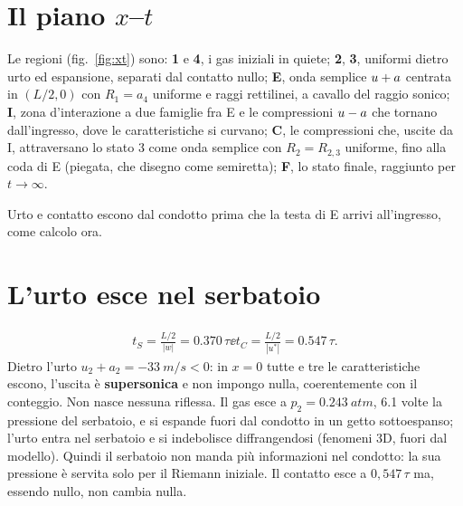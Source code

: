 \section*{Il piano $x$--$t$}
Le regioni (fig.~\ref{fig:xt}) sono: \textbf{1} e \textbf{4}, i gas iniziali in quiete; \textbf{2}, \textbf{3}, uniformi
dietro urto ed espansione, separati dal contatto nullo; \textbf{E}, onda semplice $u+a$ centrata in $(L/2,0)$ con $R_1=a_4$
uniforme e raggi rettilinei, a cavallo del raggio sonico; \textbf{I}, zona d'interazione a due famiglie fra E e le
compressioni $u-a$ che tornano dall'ingresso, dove le caratteristiche si curvano; \textbf{C}, le compressioni che,
uscite da I, attraversano lo stato 3 come onda semplice con $R_2=R_{2,3}$ uniforme, fino alla coda di E (piegata, che
disegno come semiretta); \textbf{F}, lo stato finale, raggiunto per $t\to\infty$.

Urto e contatto escono dal condotto prima che la testa di E arrivi all'ingresso, come calcolo ora.

\section*{L'urto esce nel serbatoio}
\begin{gather*}
  t_S=\frac{L/2}{|w|}=\num{0.370}\,\tau \ee t_C=\frac{L/2}{|u^*|}=\num{0.547}\,\tau.
\end{gather*}
Dietro l'urto $u_2+a_2=\SI{-33}{m/s}<0$: in $x=0$ tutte e tre le caratteristiche escono, l'uscita è
\textbf{supersonica} e non impongo nulla, coerentemente con il conteggio. Non nasce nessuna riflessa. Il gas esce a
$p_2=\SI{0.243}{atm}$, \num{6.1} volte la pressione del serbatoio, e si espande fuori dal condotto in un getto
sottoespanso; l'urto entra nel serbatoio e si indebolisce diffrangendosi (fenomeni 3D, fuori dal modello). Quindi il
serbatoio non manda più informazioni nel condotto: la sua pressione è servita solo per il Riemann iniziale. Il
contatto esce a $0{,}547\,\tau$ ma, essendo nullo, non cambia nulla.

